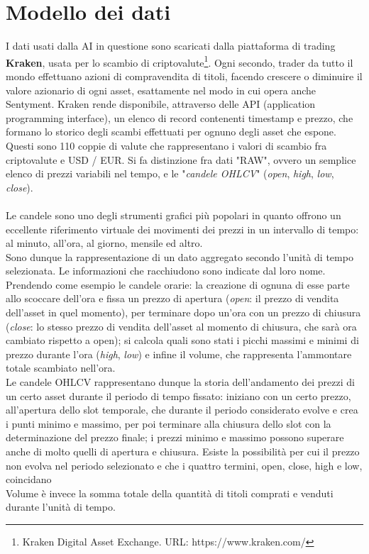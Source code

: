 \documentclass[a4paper,12pt]{report}
\begin{document}
\section{Modello dei dati}
I dati usati dalla AI in questione sono scaricati dalla piattaforma di trading \textbf{Kraken}, usata per lo scambio di criptovalute\footnote{Kraken Digital Asset Exchange. URL: https://www.kraken.com/}. Ogni secondo, trader da tutto il mondo effettuano azioni di compravendita di titoli, facendo crescere o diminuire il valore azionario di ogni asset, esattamente nel modo in cui opera anche Sentyment. Kraken rende disponibile, attraverso delle API (application programming interface), un elenco di record contenenti timestamp e prezzo, che formano lo storico degli scambi effettuati per ognuno degli asset che espone. Questi sono 110 coppie di valute che rappresentano i valori di scambio fra criptovalute e USD / EUR. Si fa distinzione fra dati "RAW", ovvero un semplice elenco di prezzi variabili nel tempo, e le "\textit{candele OHLCV}" (\textit{open}, \textit{high}, \textit{low}, \textit{close}).\\~\\ Le candele sono uno degli strumenti grafici più popolari in quanto offrono un eccellente riferimento virtuale dei movimenti dei prezzi in un intervallo di tempo: al minuto, all'ora, al giorno, mensile ed altro.\\
Sono dunque la rappresentazione di un dato aggregato secondo l'unità di tempo selezionata. Le informazioni che racchiudono sono indicate dal loro nome. Prendendo come esempio le candele orarie: la creazione di ognuna di esse parte allo scoccare dell'ora e fissa un prezzo di apertura (\textit{open}: il prezzo di vendita dell'asset in quel momento), per terminare dopo un'ora con un prezzo di chiusura (\textit{close}: lo stesso prezzo di vendita dell'asset al momento di chiusura, che sarà ora cambiato rispetto a open); si calcola quali sono stati i picchi massimi e minimi di prezzo durante l'ora (\textit{high}, \textit{low}) e infine il volume, che rappresenta l'ammontare totale scambiato nell'ora.\\
Le candele OHLCV rappresentano dunque la storia dell'andamento dei prezzi di un certo asset durante il periodo di tempo fissato: iniziano con un certo prezzo, all'apertura dello slot temporale, che durante il periodo considerato evolve e crea i punti minimo e massimo, per poi terminare alla chiusura dello slot con la determinazione del prezzo finale; i prezzi minimo e massimo possono superare anche di molto quelli di apertura e chiusura. Esiste la possibilità per cui il prezzo non evolva nel periodo selezionato e che i quattro termini, open, close, high e low, coincidano\\ Volume è invece la somma totale della quantità di titoli comprati e venduti durante l'unità di tempo.
\end{document}
